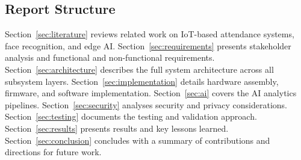 \subsection{Report Structure}
\label{subsec:structure}

Section~\ref{sec:literature} reviews related work on IoT-based attendance
systems, face recognition, and edge AI.
Section~\ref{sec:requirements} presents stakeholder analysis and
functional and non-functional requirements.
Section~\ref{sec:architecture} describes the full system architecture
across all subsystem layers.
Section~\ref{sec:implementation} details hardware assembly, firmware, and
software implementation.
Section~\ref{sec:ai} covers the AI analytics pipelines.
Section~\ref{sec:security} analyses security and privacy considerations.
Section~\ref{sec:testing} documents the testing and validation approach.
Section~\ref{sec:results} presents results and key lessons learned.
Section~\ref{sec:conclusion} concludes with a summary of contributions
and directions for future work.

